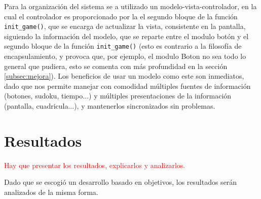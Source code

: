 \documentclass[12pt,letterpaper]{article}
\begin{document}
Para la organización del sistema se a utilizado un
modelo-vista-controlador, en la cual el controlador es proporcionado
por la el segundo bloque de la función \texttt{init\_game()}, que se
encarga de actualizar la vista, consistente en la pantalla, siguiendo
la información del modelo, que se reparte entre el modulo botón y el
segundo bloque de la función \texttt{init\_game()} (esto es contrario
a la filosofía de encapsulamiento, y provoca que, por ejemplo, el
modulo Boton no sea todo lo general que pudiera, esto se comenta con
más profundidad en la sección \ref{subsec:mejora}). Los beneficios de
usar un modelo como este son inmediatos, dado que nos permite manejar
con comodidad múltiples fuentes de información (botones, sudoku,
tiempo...) y múltiples presentaciones de la información (pantalla,
cuadricula...), y mantenerlos sincronizados sin problemas.


\section{Resultados}
\label{sec:resultados}
\textcolor{red}{
  Hay que presentar los resultados, explicarlos y analizarlos.
}

Dado que se escogió un desarrollo basado en objetivos, los resultados
serán analizados de la misma forma.
\end{document}
